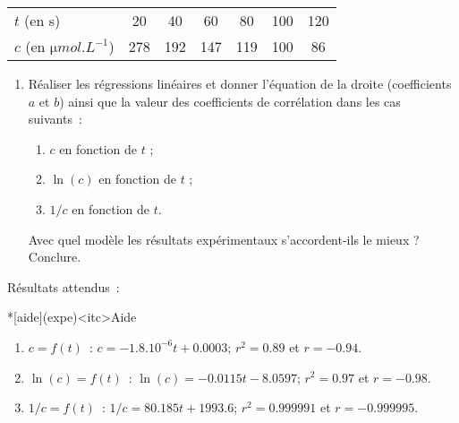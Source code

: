\documentclass[a4paper, 12pt, garamond]{book}
\begin{document}
\begin{center}
	\begin{tabular}{ l  c  c  c  c  c  c }
		\toprule
		$t$ (en s)                        & 20  & 40  & 60  & 80  & 100 & 120 \\
		$c$ (en $\si{\micro mol.L^{-1}}$) & 278 & 192 & 147 & 119 & 100 & 86  \\
		\bottomrule
	\end{tabular}
\end{center}

\begin{enumerate}
	\item Réaliser les régressions linéaires et donner l'équation de la
	      droite (coefficients $a$ et $b$) ainsi que la valeur des coefficients de
	      corrélation dans les cas suivants~:
	      \begin{enumerate}
		      \item $c$ en fonction de $t$ ;
		      \item $\ln(c)$ en fonction de $t$ ;
		      \item $1/c$ en fonction de $t$.
	      \end{enumerate}
	      Avec quel modèle les résultats expérimentaux s'accordent-ils le mieux ?
	      Conclure.
\end{enumerate}

\vfill

Résultats attendus~:

\begin{tcn}*[aide](expe)<itc>{Aide}
	\begin{enumerate}
		\item $c = f(t)$~: $c = -\num{1,8}.10^{-6} t + \num{0,0003}$; $r^2 =
			      \num{0,89}$ et $r = - \num{0,94}$.
		\item $\ln(c) = f(t)$~: $\ln(c) = -\num{0,0115} t - \num{8,0597}$; $r^2 =
			      \num{0,97}$ et $r = - \num{0,98}$.
		\item $1/c = f(t)$~: $1/c = \num{80,185} t + \num{1993,6}$; $r^2 =
			      \num{0,999991}$ et $r = - \num{0,999995}$.
	\end{enumerate}
\end{tcn}
\end{document}
